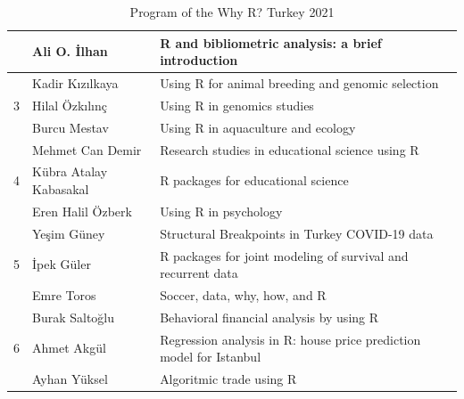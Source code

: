 {\begin{table}[h]
\begin{tabular}{p{1cm}p{4cm}p{6cm}}
         & Ali O. İlhan & R and bibliometric analysis: a brief introduction \vspace{2mm}\\\hline
         
         & Kadir Kızılkaya & Using R for animal breeding and genomic selection\vspace{2mm}\\\cline{2-3}
         
         3& Hilal Özkılınç & Using R in genomics studies \vspace{2mm}\\\cline{2-3}
         
         & Burcu Mestav & Using R in aquaculture and ecology \vspace{2mm}\\\hline
         
         & Mehmet Can Demir & Research studies in educational science using R  \vspace{2mm}\\\cline{2-3}
         
         4& Kübra Atalay Kabasakal & R packages for educational science \vspace{2mm}\\\cline{2-3}
         
         & Eren Halil Özberk & Using R in psychology\vspace{2mm}\\\hline
         
         & Yeşim Güney & Structural Breakpoints in Turkey COVID-19 data \vspace{2mm}\\\cline{2-3}
         
        5 & İpek Güler & R packages for joint modeling of survival and recurrent data\vspace{2mm}\\\cline{2-3}
         
         & Emre Toros & Soccer, data, why, how, and R\vspace{2mm}\\\hline
         
         & Burak Saltoğlu & Behavioral financial analysis by using R\vspace{2mm}\\\cline{2-3}
         
         6& Ahmet Akgül & Regression analysis in R: house price prediction model for Istanbul\vspace{2mm}\\\cline{2-3}
         
         & Ayhan Yüksel & Algoritmic trade using R\vspace{2mm}\\\hline
    \end{tabular}
    \caption{Program of the Why R? Turkey 2021}
    \label{tab:prog}
\end{table}
}

